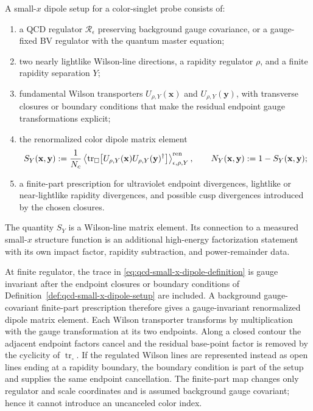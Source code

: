 \begin{definition}
\label{def:qcd-small-x-dipole-setup}
A small-\(x\) dipole setup for a color-singlet probe consists of:
\begin{enumerate}
  \item a QCD regulator \(\mathcal R_\epsilon\) preserving background gauge
  covariance, or a gauge-fixed BV regulator with the quantum master equation;
  \item two nearly lightlike Wilson-line directions, a rapidity regulator
  \(\rho\), and a finite rapidity separation \(Y\);
  \item fundamental Wilson transporters
  \(U_{\rho,Y}(\mathbf x)\) and \(U_{\rho,Y}(\mathbf y)\), with transverse
  closures or boundary conditions that make the residual endpoint gauge
  transformations explicit;
  \item the renormalized color dipole matrix element
  \begin{equation}
    S_Y(\mathbf x,\mathbf y)
    :=
    \frac1{N_c}
    \left\langle
      \operatorname{tr}_{\square}
      \bigl[
        U_{\rho,Y}(\mathbf x)U_{\rho,Y}(\mathbf y)^\dagger
      \bigr]
    \right\rangle_{\epsilon,\rho,Y}^{\rm ren},
    \qquad
    N_Y(\mathbf x,\mathbf y):=1-S_Y(\mathbf x,\mathbf y);
    \label{eq:qcd-small-x-dipole-definition}
  \end{equation}
  \item a finite-part prescription for ultraviolet endpoint divergences,
  lightlike or near-lightlike rapidity divergences, and possible cusp
  divergences introduced by the chosen closures.
\end{enumerate}
The quantity \(S_Y\) is a Wilson-line matrix element.  Its connection to a
measured small-\(x\) structure function is an additional high-energy
factorization statement with its own impact factor, rapidity subtraction, and
power-remainder data.
\end{definition}

At finite regulator, the trace in
\eqref{eq:qcd-small-x-dipole-definition} is gauge invariant after the
endpoint closures or boundary conditions of
Definition~\ref{def:qcd-small-x-dipole-setup} are included.  A background
gauge-covariant finite-part prescription therefore gives a gauge-invariant
renormalized dipole matrix element.
Each Wilson transporter transforms by multiplication with the gauge
transformation at its two endpoints.  Along a closed contour the adjacent
endpoint factors cancel and the residual base-point factor is removed by the
cyclicity of \(\operatorname{tr}_{\square}\).  If the regulated Wilson lines
are represented instead as open lines ending at a rapidity boundary, the
boundary condition is part of the setup and supplies the same endpoint
cancellation.  The finite-part map changes only regulator and scale
coordinates and is assumed background gauge covariant; hence it cannot
introduce an uncanceled color index.

